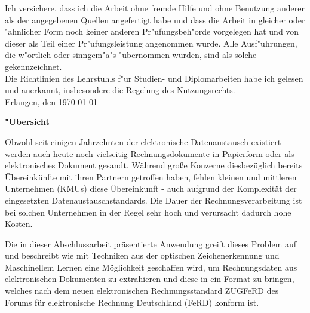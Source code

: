 \documentclass[english,mt]{lmedoc}
\begin{document}
\clearpage
  \begin{deckblatt}
  \end{deckblatt}

\cleardoublepage


Ich versichere, dass ich die Arbeit ohne fremde Hilfe und ohne Benutzung
anderer als der angegebenen Quellen angefertigt habe und dass die Arbeit
in gleicher oder "ahnlicher Form noch keiner anderen Pr"ufungsbeh"orde
vorgelegen hat und von dieser als Teil einer Pr"ufungsleistung
angenommen wurde. Alle Ausf"uhrungen, die w"ortlich oder sinngem"a"s
"ubernommen wurden, sind als solche gekennzeichnet.
\\

Die Richtlinien des Lehrstuhls f"ur Studien- und Diplomarbeiten
habe ich gelesen und anerkannt, insbesondere die Regelung des
Nutzungsrechts. \\[15mm]
Erlangen, den  \today \hspace{6.0cm} \\[10mm]


\cleardoublepage

\begin{center}
\bfseries
"Ubersicht
\normalfont

Obwohl seit einigen Jahrzehnten der elektronische Datenaustausch existiert werden auch heute noch vielseitig Rechnungsdokumente in Papierform oder als elektronisches Dokument gesandt. W\"ahrend gro{\ss}e Konzerne diesbez\"uglich bereits \"Ubereink\"unfte mit ihren Partnern getroffen haben, fehlen kleinen und mittleren Unternehmen (KMUs) diese \"Ubereinkunft - auch aufgrund der Komplexit\"at der eingesetzten Datenaustauschstandards.
Die Dauer der Rechnungsverarbeitung ist bei solchen Unternehmen in der Regel sehr hoch und verursacht dadurch hohe Kosten. 

Die in dieser Abschlussarbeit pr\"asentierte Anwendung greift dieses Problem auf und beschreibt wie mit Techniken aus der optischen Zeichenerkennung und Maschinellem Lernen eine M\"oglichkeit geschaffen wird, um Rechnungsdaten aus elektronischen Dokumenten zu extrahieren und diese in ein Format zu bringen, welches nach dem neuen elektronischen Rechnungsstandard ZUGFeRD des Forums f\"ur elektronische Rechnung Deutschland (FeRD) konform ist.

\end{center}
\end{document}
